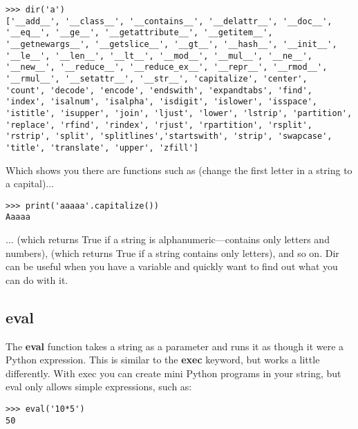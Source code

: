 \begin{Verbatim}[frame=single]
>>> dir('a')
['__add__', '__class__', '__contains__', '__delattr__', '__doc__',
'__eq__', '__ge__', '__getattribute__', '__getitem__',
'__getnewargs__', '__getslice__', '__gt__', '__hash__', '__init__',
'__le__', '__len__', '__lt__', '__mod__', '__mul__', '__ne__',
'__new__', '__reduce__', '__reduce_ex__', '__repr__', '__rmod__',
'__rmul__', '__setattr__', '__str__', 'capitalize', 'center',
'count', 'decode', 'encode', 'endswith', 'expandtabs', 'find',
'index', 'isalnum', 'isalpha', 'isdigit', 'islower', 'isspace',
'istitle', 'isupper', 'join', 'ljust', 'lower', 'lstrip', 'partition',
'replace', 'rfind', 'rindex', 'rjust', 'rpartition', 'rsplit',
'rstrip', 'split', 'splitlines','startswith', 'strip', 'swapcase',
'title', 'translate', 'upper', 'zfill']
\end{Verbatim}

Which shows you there are functions such as  (change the first letter in a string to a capital)$\ldots$

\begin{Verbatim}[frame=single]
>>> print('aaaaa'.capitalize())
Aaaaa
\end{Verbatim}

$\ldots$ (which returns True if a string is alphanumeric---contains only letters and numbers),  (which returns True if a string contains only letters), and so on. Dir can be useful when you have a variable and quickly want to find out what you can do with it.

\subsection*{eval}

The \textbf{eval} function takes a string as a parameter and runs it as though it were a Python expression.  This is similar to the \textbf{exec} keyword, but works a little differently.  With exec you can create mini Python programs in your string, but eval only allows simple expressions, such as:

\begin{Verbatim}[frame=single]
>>> eval('10*5')
50
\end{Verbatim}

